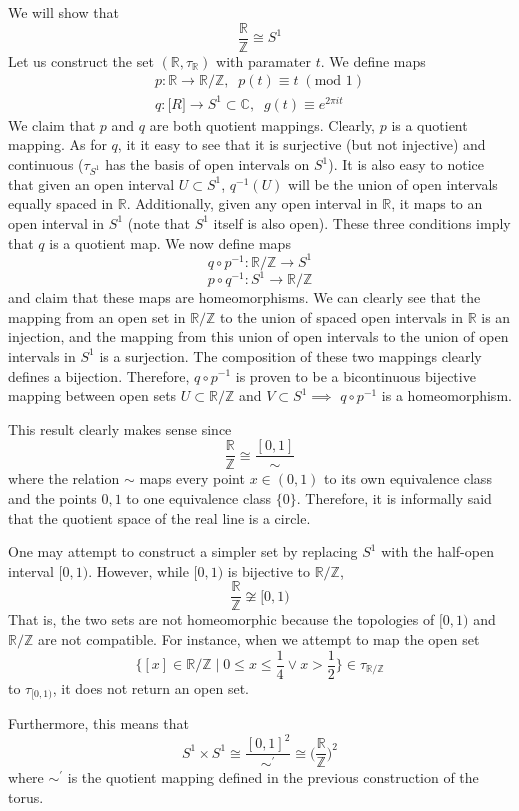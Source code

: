 \documentclass{article}
\begin{document}
    \begin{example}
    We will show that
    \[\frac{\mathbb{R}}{\mathbb{Z}} \cong S^1\]
    Let us construct the set $(\mathbb{R}, \tau_{\mathbb{R}})$ with paramater $t$. We define maps
    \begin{align*}
    p: \mathbb{R} \longrightarrow \mathbb{R} / \mathbb{Z}, \;\; p(t) \equiv t \; (\text{mod } 1) \\
    q: \mathbb[R] \longrightarrow S^1 \subset \mathbb{C}, \;\; g(t) \equiv e^{2 \pi i t} 
    \end{align*}
    We claim that $p$ and $q$ are both quotient mappings. Clearly, $p$ is a quotient mapping. As for $q$, it it easy to see that it is surjective (but not injective) and continuous ($\tau_{S^1}$ has the basis of open intervals on $S^1$). It is also easy to notice that given an open interval $U \subset S^1$, $q^{-1}(U)$ will be the union of open intervals equally spaced in $\mathbb{R}$. Additionally, given any open interval in $\mathbb{R}$, it maps to an open interval in $S^1$ (note that $S^1$ itself is also open). These three conditions imply that $q$ is a quotient map. We now define maps 
    \[ q \circ p^{-1}: \mathbb{R} / \mathbb{Z} \longrightarrow S^1 \]
    \[ p \circ q^{-1}: S^1 \longrightarrow \mathbb{R} / \mathbb{Z} \]
    and claim that these maps are homeomorphisms. We can clearly see that the mapping from an open set in $\mathbb{R} / \mathbb{Z}$ to the union of spaced open intervals in $\mathbb{R}$ is an injection, and the mapping from this union of open intervals to the union of open intervals in $S^1$ is a surjection. The composition of these two mappings clearly defines a bijection. Therefore, $q \circ p^{-1}$ is proven to be a bicontinuous bijective mapping between open sets $U \subset \mathbb{R} / \mathbb{Z}$ and $V \subset S^1 \implies$ $q \circ p^{-1}$ is a homeomorphism. 

    This result clearly makes sense since 
    \[\frac{\mathbb{R}}{\mathbb{Z}} \cong \frac{[0,1]}{\sim}\]
    where the relation $\sim$ maps every point $x \in (0,1)$ to its own equivalence class and the points $0, 1$ to one equivalence class $\{0\}$. Therefore, it is informally said that the quotient space of the real line is a circle. 

    One may attempt to construct a simpler set by replacing $S^1$ with the half-open interval $[0,1)$. However, while $[0,1)$ is bijective to $\mathbb{R} / \mathbb{Z}$,
    \[\frac{\mathbb{R}}{\mathbb{Z}} \not\cong [0,1)\]
    That is, the two sets are not homeomorphic because the topologies of $[0,1)$ and $\mathbb{R} / \mathbb{Z}$ are not compatible. For instance, when we attempt to map the open set 
    \[ \bigg\{ [x] \in \mathbb{R} / \mathbb{Z} \; | \; 0 \leq x \leq \frac{1}{4} \vee x > \frac{1}{2} \bigg\} \in \tau_{\mathbb{R} / \mathbb{Z}} \]
    to $\tau_{[0,1)}$, it does not return an open set. 


    Furthermore, this means that
    \[S^1 \times S^1 \cong \frac{[0,1]^2}{\sim^\prime} \cong \bigg( \frac{\mathbb{R}}{\mathbb{Z}} \bigg)^2\]
    where $\sim^\prime$ is the quotient mapping defined in the previous construction of the torus. 
    \end{example}
\end{document}
